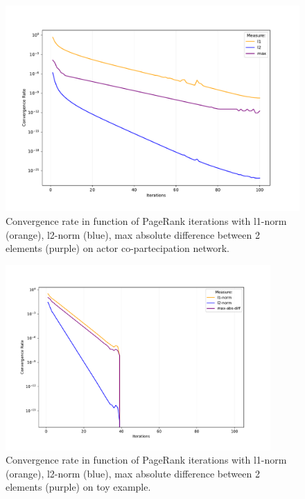 \documentclass{article}
\begin{document}
\begin{figure}
    \centering
    \includegraphics[width=\textwidth]{convergence_per_iteration.pdf}
    \caption{Convergence rate in function of PageRank iterations with l1-norm (orange), l2-norm (blue), max absolute difference between 2 elements (purple) on actor co-partecipation network.}
    \label{fig:convergence}
\end{figure}

\begin{figure}
    \centering
    \includegraphics[width=0.9\textwidth]{toy_convergence_per_iteration.pdf}
    \caption{Convergence rate in function of PageRank iterations with l1-norm (orange), l2-norm (blue), max absolute difference between 2 elements (purple) on toy example.}
    \label{fig:toy-convergence}
\end{figure}
\end{document}
